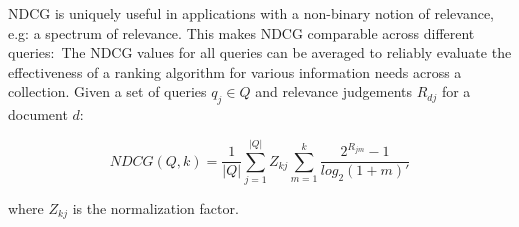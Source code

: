 NDCG is uniquely useful in applications with a non-binary notion of relevance, e.g: a spectrum of relevance.
This makes NDCG comparable across different queries:\
The NDCG values for all queries can be averaged to reliably evaluate the effectiveness of a ranking algorithm for various information needs across a collection.
Given a set of queries $ q_j \in Q $ and relevance judgements $ R_{dj} $ for a document $ d $:\

\begin{equation}
NDCG(Q, k) = \frac{1}{|Q|} \sum ^{|Q|} _{j = 1} Z_{kj} \sum ^k _{m = 1} \frac{2^{R_{jm}} - 1}{log_2 (1 + m)'}
\end{equation}

\noindent where $ Z_{kj} $ is the normalization factor.
